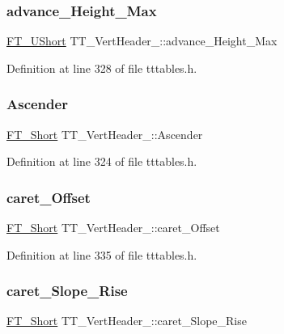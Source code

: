 \subsubsection{\texorpdfstring{advance\_Height\_Max}{advance\_Height\_Max}}
{\footnotesize\ttfamily \mbox{\hyperlink{fttypes_8h_a937f6c17cf5ffd09086d8610c37b9f58}{F\+T\+\_\+\+U\+Short}} T\+T\+\_\+\+Vert\+Header\+\_\+\+::advance\+\_\+\+Height\+\_\+\+Max}



Definition at line 328 of file tttables.\+h.

\mbox{\label{struct_t_t___vert_header___afa95848b08d1fc8bd6bfe7e639e2895c}} 
\subsubsection{\texorpdfstring{Ascender}{Ascender}}
{\footnotesize\ttfamily \mbox{\hyperlink{fttypes_8h_aa7279be89046a2563cd3d4d6651fbdcf}{F\+T\+\_\+\+Short}} T\+T\+\_\+\+Vert\+Header\+\_\+\+::\+Ascender}



Definition at line 324 of file tttables.\+h.

\mbox{\label{struct_t_t___vert_header___a89ff9369f61dc5b770cde0eda954d402}} 
\subsubsection{\texorpdfstring{caret\_Offset}{caret\_Offset}}
{\footnotesize\ttfamily \mbox{\hyperlink{fttypes_8h_aa7279be89046a2563cd3d4d6651fbdcf}{F\+T\+\_\+\+Short}} T\+T\+\_\+\+Vert\+Header\+\_\+\+::caret\+\_\+\+Offset}



Definition at line 335 of file tttables.\+h.

\mbox{\label{struct_t_t___vert_header___a3218533a7d8ac5a8ebd70a970cbdbbcc}} 
\subsubsection{\texorpdfstring{caret\_Slope\_Rise}{caret\_Slope\_Rise}}
{\footnotesize\ttfamily \mbox{\hyperlink{fttypes_8h_aa7279be89046a2563cd3d4d6651fbdcf}{F\+T\+\_\+\+Short}} T\+T\+\_\+\+Vert\+Header\+\_\+\+::caret\+\_\+\+Slope\+\_\+\+Rise}



